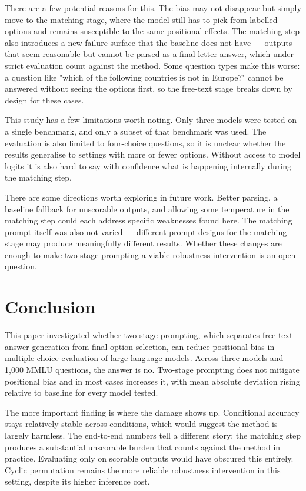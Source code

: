 \documentclass{article}
\begin{document}
There are a few potential reasons for this. The bias may not disappear but simply move to the matching stage, where the model still has to pick from labelled options and remains susceptible to the same positional effects. The matching step also introduces a new failure surface that the baseline does not have --- outputs that seem reasonable but cannot be parsed as a final letter answer, which under strict evaluation count against the method. Some question types make this worse: a question like "which of the following countries is not in Europe?" cannot be answered without seeing the options first, so the free-text stage breaks down by design for these cases.

This study has a few limitations worth noting. Only three models were tested on a single benchmark, and only a subset of that benchmark was used. The evaluation is also limited to four-choice questions, so it is unclear whether the results generalise to settings with more or fewer options. Without access to model logits it is also hard to say with confidence what is happening internally during the matching step.

There are some directions worth exploring in future work. Better parsing, a baseline fallback for unscorable outputs, and allowing some temperature in the matching step could each address specific weaknesses found here. The matching prompt itself was also not varied --- different prompt designs for the matching stage may produce meaningfully different results. Whether these changes are enough to make two-stage prompting a viable robustness intervention is an open question.
 
\section{Conclusion}
This paper investigated whether two-stage prompting, which separates free-text answer generation from final option selection, can reduce positional bias in multiple-choice evaluation of large language models. Across three models and 1,000 MMLU questions, the answer is no. Two-stage prompting does not mitigate positional bias and in most cases increases it, with mean absolute deviation rising relative to baseline for every model tested.

The more important finding is where the damage shows up. Conditional accuracy stays relatively stable across conditions, which would suggest the method is largely harmless. The end-to-end numbers tell a different story: the matching step produces a substantial unscorable burden that counts against the method in practice. Evaluating only on scorable outputs would have obscured this entirely. Cyclic permutation remains the more reliable robustness intervention in this setting, despite its higher inference cost.
\end{document}
